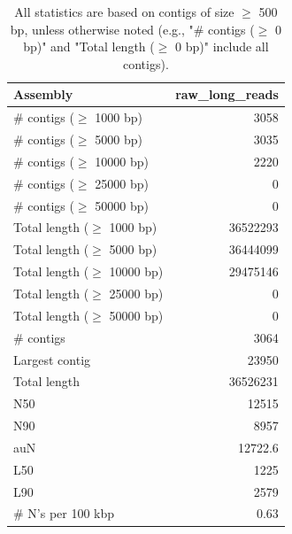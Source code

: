 \documentclass[12pt,a4paper]{article}
\begin{document}
\begin{table}[ht]
\begin{center}
\caption{All statistics are based on contigs of size $\geq$ 500 bp, unless otherwise noted (e.g., "\# contigs ($\geq$ 0 bp)" and "Total length ($\geq$ 0 bp)" include all contigs).}
\begin{tabular}{|l*{1}{|r}|}
\hline
Assembly & raw\_long\_reads \\ \hline
\# contigs ($\geq$ 1000 bp) & 3058 \\ \hline
\# contigs ($\geq$ 5000 bp) & 3035 \\ \hline
\# contigs ($\geq$ 10000 bp) & 2220 \\ \hline
\# contigs ($\geq$ 25000 bp) & 0 \\ \hline
\# contigs ($\geq$ 50000 bp) & 0 \\ \hline
Total length ($\geq$ 1000 bp) & 36522293 \\ \hline
Total length ($\geq$ 5000 bp) & 36444099 \\ \hline
Total length ($\geq$ 10000 bp) & 29475146 \\ \hline
Total length ($\geq$ 25000 bp) & 0 \\ \hline
Total length ($\geq$ 50000 bp) & 0 \\ \hline
\# contigs & 3064 \\ \hline
Largest contig & 23950 \\ \hline
Total length & 36526231 \\ \hline
N50 & 12515 \\ \hline
N90 & 8957 \\ \hline
auN & 12722.6 \\ \hline
L50 & 1225 \\ \hline
L90 & 2579 \\ \hline
\# N's per 100 kbp & 0.63 \\ \hline
\end{tabular}
\end{center}
\end{table}
\end{document}
